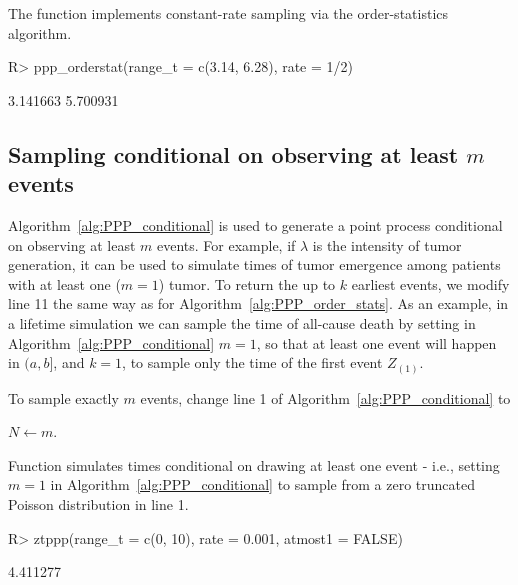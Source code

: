 \documentclass[article,nojss]{jss}\usepackage[]{graphicx}\usepackage[]{xcolor}
\newcommand{\fct}[1]{\code{#1()}}
\begin{document}
The \fct{ppp\_orderstat} function implements constant-rate sampling via the order-statistics algorithm.

\begin{Schunk}
\begin{Sinput}
R> ppp_orderstat(range_t = c(3.14, 6.28), rate = 1/2)
\end{Sinput}
\begin{Soutput}
[1] 3.141663 5.700931
\end{Soutput}
\end{Schunk}

\subsection[Sampling conditional on observing at least m events]{Sampling conditional on observing at least $m$ events}\label{sec:PPP_cond_sampling}



Algorithm~\ref{alg:PPP_conditional} is used to generate a point process conditional on observing at least $m$ events. For example, if $\lambda$ is the intensity of tumor generation, it can be used to simulate times of tumor emergence among patients with at least one ($m=1$) tumor. To return the up to $k$ earliest events, we modify line 11 the same way as for Algorithm~\ref{alg:PPP_order_stats}. As an example, in a lifetime simulation we can sample the time of all-cause death by setting in Algorithm~\ref{alg:PPP_conditional} $m=1$, so that at least one event will happen in $(a, b]$, and $k = 1$, to sample only the time of the first event $Z_{(1)}$.

To sample exactly $m$ events, change line 1 of Algorithm~\ref{alg:PPP_conditional} to
\begin{center}
$N \gets m$.
\end{center}

Function \fct{ztppp} simulates times conditional on drawing at least one event - i.e., setting $m=1$ in Algorithm~\ref{alg:PPP_conditional} to sample from a zero truncated Poisson distribution in line 1.
\begin{Schunk}
\begin{Sinput}
R> ztppp(range_t = c(0, 10), rate = 0.001, atmost1 = FALSE)
\end{Sinput}
\begin{Soutput}
[1] 4.411277
\end{Soutput}
\end{Schunk}
\end{document}

